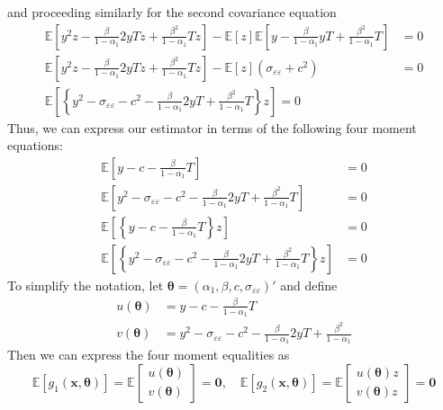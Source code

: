 \documentclass[12pt]{article}
\begin{document}
and proceeding similarly for the second covariance equation
\begin{align*}
  \mathbb{E}\left[ y^2z - \frac{\beta}{1 - \alpha_1} 2yTz + \frac{\beta^2}{1 - \alpha_1} Tz \right] - \mathbb{E}[z]\mathbb{E}\left[ y - \frac{\beta}{1 - \alpha_1}yT + \frac{\beta^2}{1 - \alpha_1} T \right] &= 0\\
  \mathbb{E}\left[ y^2z - \frac{\beta}{1 - \alpha_1} 2yTz + \frac{\beta^2}{1 - \alpha_1} Tz \right] - \mathbb{E}[z]\left( \sigma_{\varepsilon\varepsilon} + c^2 \right) &= 0\\
  \mathbb{E}\left[ \left\{y^2 - \sigma_{\varepsilon\varepsilon} - c^2 -\frac{\beta}{1 - \alpha_1} 2yT + \frac{\beta^2}{1 - \alpha_1} T\right\}z \right] = 0 
\end{align*}
Thus, we can express our estimator in terms of the following four moment equations:
\begin{align*}
  \mathbb{E}\left[ y - c -  \frac{\beta}{1 - \alpha_1} T \right] &= 0\\
  \mathbb{E}\left[ y^2 - \sigma_{\varepsilon\varepsilon} - c^2 -\frac{\beta}{1 - \alpha_1} 2yT + \frac{\beta^2}{1 - \alpha_1} T\right] &= 0 \\
  \mathbb{E}\left[ \left\{y - c -  \frac{\beta}{1 - \alpha_1} T\right\}z \right] &= 0\\
  \mathbb{E}\left[ \left\{y^2 - \sigma_{\varepsilon\varepsilon} - c^2 -\frac{\beta}{1 - \alpha_1} 2yT + \frac{\beta^2}{1 - \alpha_1} T\right\}z \right] &= 0 
\end{align*}
To simplify the notation, let $\boldsymbol{\theta} = (\alpha_1, \beta, c, \sigma_{\varepsilon\varepsilon})'$ and define
\begin{align*}
  u(\boldsymbol{\theta}) &= y - c - \frac{\beta}{1 - \alpha_1} T\\
  v(\boldsymbol{\theta}) &= y^2 - \sigma_{\varepsilon\varepsilon} - c^2 - \frac{\beta}{1 - \alpha_1} 2yT + \frac{\beta^2}{1 - \alpha_1}
\end{align*}
Then we can express the four moment equalities as 
\[
  \mathbb{E}\left[ g_1(\mathbf{x}, \boldsymbol{\theta}) \right] = \mathbb{E}
  \left[
  \begin{array}{c}
    u(\boldsymbol{\theta})\\ v(\boldsymbol{\theta})
  \end{array}
\right] = \mathbf{0}, \quad
\mathbb{E}\left[ g_2(\mathbf{x}, \boldsymbol{\theta}) \right] = \mathbb{E}
  \left[
  \begin{array}{c}
    u(\boldsymbol{\theta}) z\\ v(\boldsymbol{\theta}) z
  \end{array}
\right] = \mathbf{0}
\]
\end{document}
